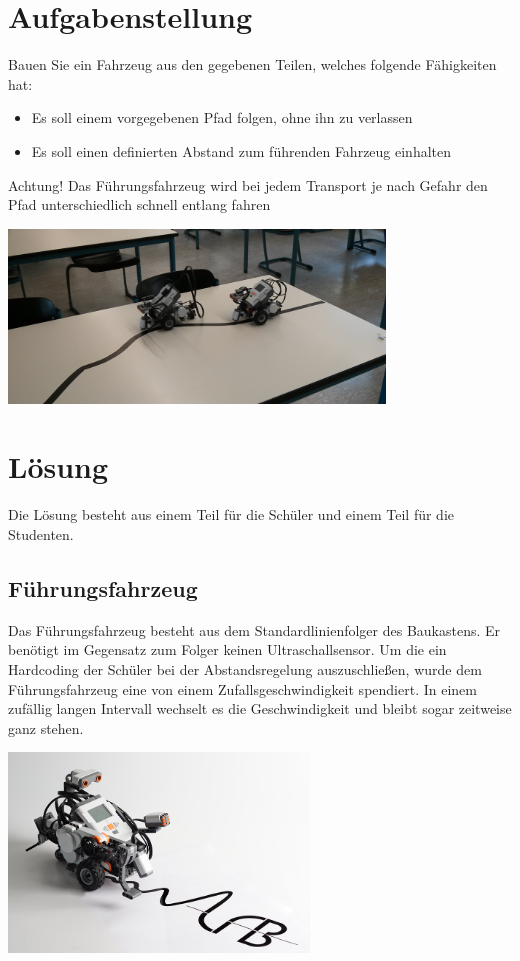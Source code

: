 \section{Aufgabenstellung}
Bauen Sie ein Fahrzeug aus den gegebenen Teilen, welches folgende Fähigkeiten hat:

\begin{itemize}
	\item Es soll einem vorgegebenen Pfad folgen, ohne ihn zu verlassen
	\item Es soll einen definierten Abstand zum führenden Fahrzeug einhalten
\end{itemize}

Achtung! Das Führungsfahrzeug wird bei jedem Transport je nach Gefahr den Pfad unterschiedlich schnell entlang fahren

\begin{capfigure}[Strecke]
	\includegraphics[width=10cm]{images/fotokonvoi}
\end{capfigure}
    
\section{Lösung}
Die Lösung besteht aus einem Teil für die Schüler und einem Teil für die Studenten.
    
\subsection{Führungsfahrzeug}
Das Führungsfahrzeug besteht aus dem Standardlinienfolger des Baukastens. Er benötigt im Gegensatz zum Folger keinen Ultraschallsensor. Um die ein Hardcoding der Schüler bei der Abstandsregelung auszuschließen, wurde dem Führungsfahrzeug eine von einem Zufallsgeschwindigkeit spendiert. In einem zufällig langen Intervall wechselt es die Geschwindigkeit und bleibt sogar zeitweise ganz stehen. 
      
      
      \begin{capfigure}[Standardmodell]
	\includegraphics[width=8cm]{images/robostand.png}
      \end{capfigure}
     
